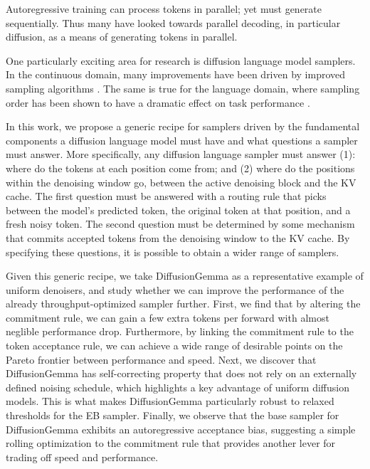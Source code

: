 Autoregressive training can process tokens in parallel; yet must generate sequentially.
Thus many have looked towards parallel decoding, in particular diffusion, as a means of generating tokens in parallel.

One particularly exciting area for research is diffusion language model samplers.
In the continuous domain, many improvements have been driven by improved sampling algorithms \citep{song2020denoising}. 
The same is true for the language domain, where sampling order has been shown to have a dramatic effect on task performance \citep{kim2025train, ben2026accelerated, kim2026klass}.

In this work, we propose a generic recipe for samplers driven by the fundamental components a diffusion language model must have and what questions a sampler must answer. More specifically, any diffusion language sampler must answer (1): where do the tokens at each position come from; and (2) where do the positions within the denoising window go, between the active denoising block and the KV cache.
The first question must be answered with a routing rule that picks between the model's predicted token, the original token at that position, and a fresh noisy token.
The second question must be determined by some mechanism that commits accepted tokens from the denoising window to the KV cache.
By specifying these questions, it is possible to obtain a wider range of samplers.

Given this generic recipe, we take DiffusionGemma as a representative example of uniform denoisers, and study whether we can improve the performance of the already throughput-optimized sampler further. 
First, we find that by altering the commitment rule, we can gain a few extra tokens per forward with almost neglible performance drop.
Furthermore, by linking the commitment rule to the token acceptance rule, we can achieve a wide range of desirable points on the Pareto frontier between performance and speed.
Next, we discover that DiffusionGemma has self-correcting property that does not rely on an externally defined noising schedule, which highlights a key advantage of uniform diffusion models.
This is what makes DiffusionGemma particularly robust to relaxed thresholds for the EB sampler.
Finally, we observe that the base sampler for DiffusionGemma exhibits an autoregressive acceptance bias, suggesting a simple rolling optimization to the commitment rule that provides another lever for trading off speed and performance.

